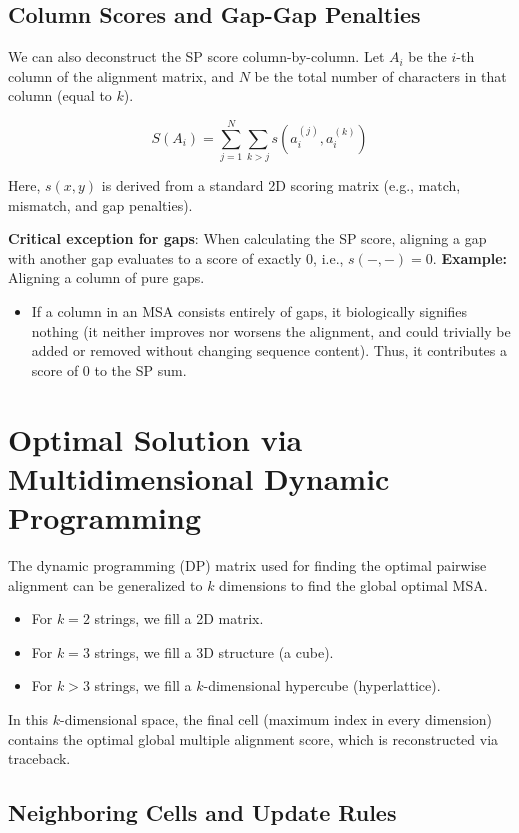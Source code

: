 \subsection{Column Scores and Gap-Gap Penalties}

We can also deconstruct the SP score column-by-column. Let $A_i$ be the $i$-th column of the alignment matrix, and $N$ be the total number of characters in that column (equal to $k$).

\[
S(A_i) = \sum_{j=1}^N \sum_{k>j} s(a_i^{(j)}, a_i^{(k)})
\]

Here, $s(x,y)$ is derived from a standard 2D scoring matrix (e.g., match, mismatch, and gap penalties).

\sta \textbf{Critical exception for gaps}: When calculating the SP score, aligning a gap with another gap evaluates to a score of exactly $0$, i.e., $s(-,-) = 0$.
\textbf{Example:} Aligning a column of pure gaps.
\begin{itemize}
    \item If a column in an MSA consists entirely of gaps, it biologically signifies nothing (it neither improves nor worsens the alignment, and could trivially be added or removed without changing sequence content). Thus, it contributes a score of 0 to the SP sum.
\end{itemize}

\section{Optimal Solution via Multidimensional Dynamic Programming}

The dynamic programming (DP) matrix used for finding the optimal pairwise alignment can be generalized to $k$ dimensions to find the global optimal MSA.

\begin{itemize}
    \item For $k=2$ strings, we fill a 2D matrix.
    \item For $k=3$ strings, we fill a 3D structure (a cube).
    \item For $k>3$ strings, we fill a $k$-dimensional hypercube (hyperlattice).
\end{itemize}

In this $k$-dimensional space, the final cell (maximum index in every dimension) contains the optimal global multiple alignment score, which is reconstructed via traceback.

\subsection{Neighboring Cells and Update Rules}

